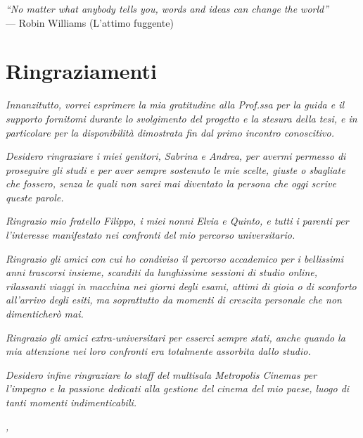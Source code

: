 \cleardoublepage
{}
{}

\begin{flushright}{
    \slshape
    ``No matter what anybody tells you, words and ideas can change the world''} \\
    \medskip
    --- Robin Williams (L'attimo fuggente)
\end{flushright}


\bigskip

\begingroup
\let\clearpage\relax
\let\cleardoublepage\relax
\let\cleardoublepage\relax

\chapter*{Ringraziamenti}

\par \textit{Innanzitutto, vorrei esprimere la mia gratitudine alla Prof.ssa \myProf{} per la guida e il supporto fornitomi durante lo svolgimento del progetto e la stesura della tesi, e in particolare per la disponibilità dimostrata fin dal primo incontro conoscitivo.}

\vspace{10pt}
\par\noindent \textit{Desidero ringraziare i miei genitori, Sabrina e Andrea, per avermi permesso di proseguire gli studi e per aver sempre sostenuto le mie scelte, giuste o sbagliate che fossero, senza le quali non sarei mai diventato la persona che oggi scrive queste parole.}

\vspace{10pt}
\par\noindent \textit{Ringrazio mio fratello Filippo, i miei nonni Elvia e Quinto, e tutti i parenti per l’interesse manifestato nei confronti del mio percorso universitario.}

\vspace{10pt}
\par\noindent \textit{Ringrazio gli amici con cui ho condiviso il percorso accademico per i bellissimi anni trascorsi insieme, scanditi da lunghissime sessioni di studio online, rilassanti viaggi in macchina nei giorni degli esami, attimi di gioia o di sconforto all’arrivo degli esiti, ma soprattutto da momenti di crescita personale che non dimenticherò mai.}

\vspace{10pt}
\par\noindent \textit{Ringrazio gli amici extra-universitari per esserci sempre stati, anche quando la mia attenzione nei loro confronti era totalmente assorbita dallo studio.}

\vspace{10pt}
\par\noindent \textit{Desidero infine ringraziare lo staff del multisala Metropolis Cinemas per l’impegno e la passione dedicati alla gestione del cinema del mio paese, luogo di tanti momenti indimenticabili.}
\bigskip

\noindent\textit{\myLocation, \myTime}
\hfill \myName

\endgroup
